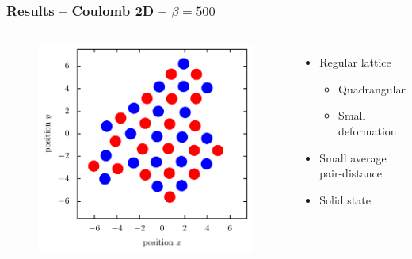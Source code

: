 \documentclass[mathserif,serif]{beamer}
\begin{document}
\begin{frame}
	\frametitle{Results -- Coulomb 2D -- $\beta=500$}
	\centering
	\begin{columns}	
	\begin{figure}
	\includegraphics[width=\textwidth]{../report/figures/Kristall_3_beta_500.pdf}
	\end{figure}
	\begin{itemize}
	\item Regular lattice
	\begin{itemize}
		\item Quadrangular
		\item Small deformation
	\end{itemize}
	\item Small average pair-distance
	\item Solid state
	\end{itemize}
\end{columns}
\end{frame}
\end{document}
